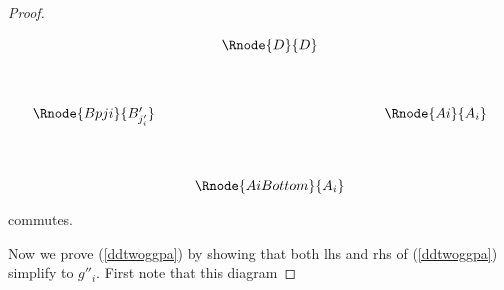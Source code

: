 \documentclass[10pt,a4paper]{scrartcl}
\begin{document}
\begin{proof}
\iffalse
\begin{center}
\begin{equation}
\label{ddtwogjigppi}
\begin{array}{cp{0.3cm}c    p{0.3cm}  c }
               & & \Rnode{D}{D} & &                                  \\ [1.3cm]
\Rnode{Bji}{B_{j_i}}   &&                          & & \Rnode{Ai}{A_i}   \\ [1.4cm]
               & & \Rnode{AiBottom}{A_i} & &   
\end{array}
\end{equation}
\ncarr{D}{Bji}
\blabel{g_{j_i}}
\ncarr{D}{Ai}
\alabel{g''_i}
\nccdar{Bji}{AiBottom}
\blabel{\pc{B_{j_i}}{A_i}}
\nccdar{Ai}{AiBottom}
\alabel{id_{A_i}}
\end{center}
commutes. By a similar argument it also follows that
\fi

\begin{center}
\begin{equation}
\label{ddtwogpjpigppi}
\begin{array}{cp{0.3cm}c    p{0.3cm}  c }
               & & \Rnode{D}{D} & &                                  \\ [1.3cm]
\Rnode{Bpji}{B'_{j'_i}}   &&                   & & \Rnode{Ai}{A_i}   \\ [1.4cm]
               & & \Rnode{AiBottom}{A_i} & &   
\end{array}
\end{equation}
\end{center}
 commutes.

\noindent
Now we prove (\ref{ddtwoggpa})  by showing that both lhs and rhs of (\ref{ddtwoggpa}) 
simplify to $g''_i$. 
First note that this diagram


\end{proof}
\end{document}
